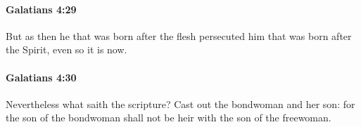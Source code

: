 		\paragraph{Galatians 4:29} %
			\label{GALATIANS-4-29}

			But as then he that was born after the flesh persecuted him that was born after the Spirit, even so it is now.

			\begin{framed}
			\scriptsize
				\begin{compactdesc}
					\item[SBLG] 
				\end{compactdesc}
			\end{framed}

		\paragraph{Galatians 4:30} %
			\label{GALATIANS-4-30}

			Nevertheless what saith the scripture?  Cast out the bondwoman and her son: for the son of the bondwoman shall not be heir with the son of the freewoman.

